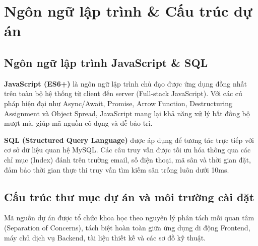 \section{Ngôn ngữ lập trình \& Cấu trúc dự án}
\label{sec:ngon-ngu-cau-truc}

\subsection{Ngôn ngữ lập trình JavaScript \& SQL}
\textbf{JavaScript (ES6+)} là ngôn ngữ lập trình chủ đạo được ứng dụng đồng nhất trên toàn bộ hệ thống từ client đến server (Full-stack JavaScript). Với các cú pháp hiện đại như Async/Await, Promise, Arrow Function, Destructuring Assignment và Object Spread, JavaScript mang lại khả năng xử lý bất đồng bộ mượt mà, giúp mã nguồn cô đọng và dễ bảo trì.

\textbf{SQL (Structured Query Language)} được áp dụng để tương tác trực tiếp với cơ sở dữ liệu quan hệ MySQL. Các câu truy vấn được tối ưu hóa thông qua các chỉ mục (Index) đánh trên trường email, số điện thoại, mã sân và thời gian đặt, đảm bảo thời gian thực thi truy vấn tìm kiếm sân trống luôn dưới 10ms.

\subsection{Cấu trúc thư mục dự án và môi trường cài đặt}
Mã nguồn dự án được tổ chức khoa học theo nguyên lý phân tách mối quan tâm (Separation of Concerns), tách biệt hoàn toàn giữa ứng dụng di động Frontend, máy chủ dịch vụ Backend, tài liệu thiết kế và các sơ đồ kỹ thuật.
